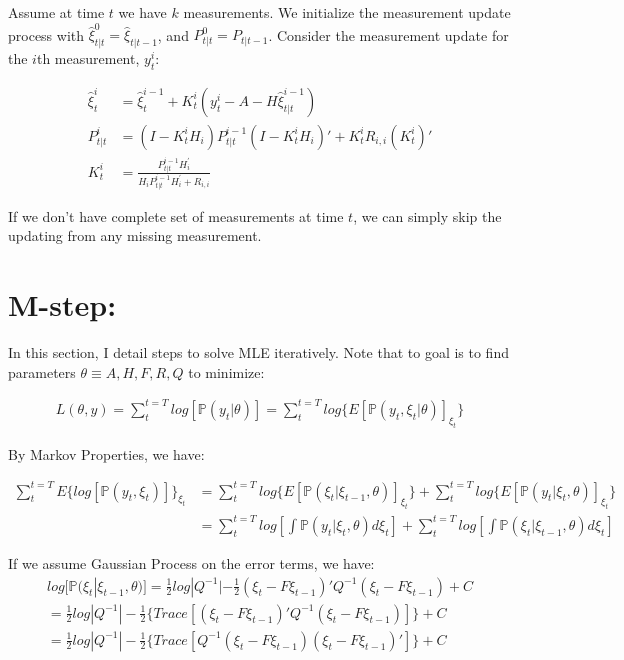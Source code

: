 \documentclass[12pt]{article}
\numberwithin{equation}{section}
\begin{document}
Assume at time $t$ we have $k$ measurements. We initialize the measurement update process with $\hat{\xi}_{t|t}^0=\hat{\xi}_{t|t-1}$, and $P_{t|t}^0=P_{t|t-1}$. Consider the measurement update for the $i$th measurement, $y_t^i$:

\begin{align*}
    \hat{\xi}_{t}^i & = \hat{\xi}_{t}^{i-1} + K_t^i(y_t^i - A - H\hat{\xi}_{t|t}^{i-1}) \\
    P_{t|t}^{i} & = (I - K_t^iH_i)P_{t|t}^{i-1}(I-K_t^iH_i)' + K_t^{i}R_{i,i}(K_t^{i})' \\
    K_t^i & = \frac{P_{t|t}^{i-1}H_i^{'}}{H_{i}P_{t|t}^{i-1}H_{i}^{'}+R_{i,i}}
\end{align*}

If we don't have complete set of measurements at time $t$, we can simply skip the updating from any missing measurement.

\section{M-step:} \label{sec:M}

In this section, I detail steps to solve MLE iteratively. Note that to goal is to find parameters $\theta \equiv {A, H, F, R, Q}$ to minimize:

\begin{align}
    L(\theta,y) = \sum_t^{t=T}log[\mathbb{P}(y_t|\theta)] = \sum_t^{t=T}log\{E[\mathbb{P}(y_t,\xi_t|\theta)]_{\xi_t}\} \label{eq:MLE}
\end{align} 

By Markov Properties, we have: 

\begin{align}
    \sum_t^{t=T}E\{log[\mathbb{P}(y_t,\xi_t)]\}_{\xi_t} &= \sum_t^{t=T}log\{E[\mathbb{P}(\xi_t|\xi_{t-1},\theta)]_{\xi_t}\}
    + \sum_t^{t=T}log\{E[\mathbb{P}(y_t|\xi_t, \theta)]_{\xi_t}\} \nonumber \\
    & = \sum_t^{t=T}log\left[\int\mathbb{P}(y_t|\xi_t,\theta)d\xi_t\right]
    + \sum_t^{t=T}log\left[\int\mathbb{P}(\xi_t|\xi_{t-1},\theta)d\xi_t\right] \nonumber 
\end{align}

If we assume Gaussian Process on the error terms, we have:
\begin{align}
    log[\mathbb{P}(\xi_t|\xi_{t-1},\theta)] = \frac{1}{2}log|Q^{-1}|-\frac{1}{2}(\xi_t-F\xi_{t-1})'Q^{-1}(\xi_t-F\xi_{t-1}) + C \nonumber \\
    = \frac{1}{2}log|Q^{-1}|-\frac{1}{2}\{Trace[(\xi_t-F\xi_{t-1})'Q^{-1}(\xi_t-F\xi_{t-1})]\} + C \nonumber \\
    = \frac{1}{2}log|Q^{-1}|-\frac{1}{2}\{Trace[Q^{-1}(\xi_t-F\xi_{t-1})(\xi_t-F\xi_{t-1})']\} + C \label{eq:mle_xi}
\end{align}
\end{document}
